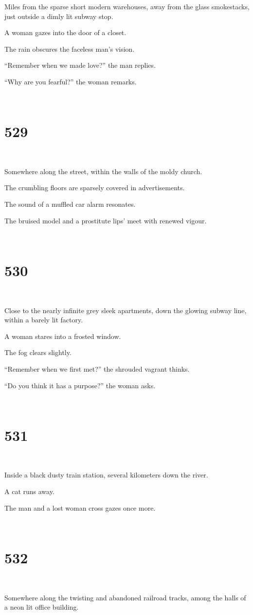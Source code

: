 \documentclass{report}
\begin{document}
Miles from the sparse short modern warehouses, away from the glass smokestacks, just outside a dimly lit subway stop.

A woman gazes into the door of a closet.

The rain obscures the faceless man's vision.

``Remember when we made love?'' the man replies.

``Why are you fearful?'' the woman remarks.

~
\chapter*{529}
~

Somewhere along the street, within the walls of the moldy church.

The crumbling floors are sparsely covered in advertisements.

The sound of a muffled car alarm resonates.

The bruised model and a prostitute lips' meet with renewed vigour.

~
\chapter*{530}
~

Close to the nearly infinite grey sleek apartments, down the glowing subway line, within a barely lit factory.

A woman stares into a frosted window.

The fog clears slightly.

``Remember when we first met?'' the shrouded vagrant thinks.

``Do you think it has a purpose?'' the woman asks.

~
\chapter*{531}
~

Inside a black dusty train station, several kilometers down the river.

A cat runs away.

The man and a lost woman cross gazes once more.

~
\chapter*{532}
~

Somewhere along the twisting and abandoned railroad tracks, among the halls of a neon lit office building.
\end{document}
